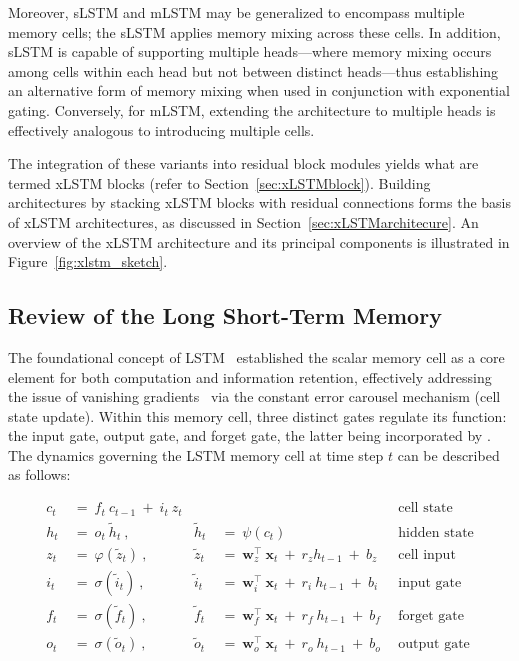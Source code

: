 Moreover, sLSTM and mLSTM may be generalized to encompass multiple memory cells; the sLSTM applies memory mixing across these cells. In addition, sLSTM is capable of supporting multiple heads—where memory mixing occurs among cells within each head but not between distinct heads—thus establishing an alternative form of memory mixing when used in conjunction with exponential gating. Conversely, for mLSTM, extending the architecture to multiple heads is effectively analogous to introducing multiple cells.

The integration of these variants into residual block modules yields what are termed xLSTM blocks (refer to Section~\ref{sec:xLSTMblock}). Building architectures by stacking xLSTM blocks with residual connections forms the basis of xLSTM architectures, as discussed in Section~\ref{sec:xLSTMarchitecure}. An overview of the xLSTM architecture and its principal components is illustrated in Figure~\ref{fig:xlstm_sketch}.

\subsection{Review of the Long Short-Term Memory}
\label{sec:orgLSTM}

The foundational concept of LSTM~\citep{Hochreiter:91,Hochreiter:97nips,Hochreiter:97} established the scalar memory cell as a core element for both computation and information retention, effectively addressing the issue of vanishing gradients~\citep{Hochreiter:91,Hochreiter:00book} via the constant error carousel mechanism (cell state update). Within this memory cell, three distinct gates regulate its function: the input gate, output gate, and forget gate, the latter being incorporated by \citet{Gers:00}. The dynamics governing the LSTM memory cell at time step $t$ can be described as follows:

\begin{align}
c_t \ &= \  f_t \ c_{t-1} \ + \ i_t \ z_t &  & &\text{cell state} \\
h_t  \ &= \ o_t \ \tilde{h}_t \ , & \tilde{h}_t \ &= \ \psi \left( c_t\right)
  &\text{hidden state} \\
z_t \ &= \ \varphi \left( \tilde{z}_t \right) \ , 
  &\tilde{z}_t \ &=  \ \mathbf{w}^\top_{z} \ \mathbf{x}_t \ + \
  r_{z}  h_{t-1} \ + \  b_{z} \ \
  &\text{cell input} \\
i_t \ &= \ \sigma \left( \tilde{i}_t  \right) \ , 
  &\tilde{i}_t \ &= \ \mathbf{w}^\top_{i} \ \mathbf{x}_t \ + \
  r_{i}  \ h_{t-1} \ + \  b_{i} \ \
  &\text{input gate} \\
f_t \ &= \ \sigma \left(  \tilde{f}_t \right) \ , 
  &\tilde{f}_t \ &= \ \mathbf{w}^\top_{f} \ \mathbf{x}_t  \ + \
  r_{f}  \ h_{t-1} \ + \  b_{f} \ \
  &\text{forget gate} \\
o_t \ &= \ \sigma \left( \tilde{o}_t \right) \ , 
  &\tilde{o}_t  \ &= \ \mathbf{w}^\top_{o} \ \mathbf{x}_t \ + \
  r_{o}  \ h_{t-1} \ + \  b_{o} \ \
  &\text{output gate} 
\end{align}

